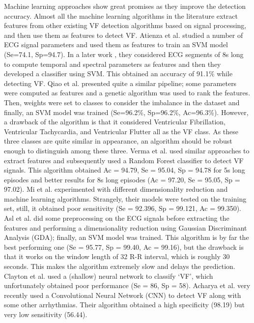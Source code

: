 \documentclass[12pt,a4paper]{article}
\begin{document}
Machine learning approaches show great promises as they improve the detection accuracy. Almost all the machine learning algorithms in the literature extract features from other existing VF detection algorithms based on signal processing, and then use them as features to detect VF. Atienza et al. \cite{alonso2012feature} studied a number of ECG signal parameters and used them as features to train an SVM model (Se=74.1, Sp=94.7). In a later work \cite{alonso2014detection}, they considered ECG segments of 8s long to compute temporal and spectral parameters as features and then they developed a classifier using SVM. This obtained an accuracy of 91.1\% while detecting VF. Qiao et al. \cite{li2014ventricular} presented quite a similar pipeline; some parameters were computed as features and a genetic algorithm was used to rank the features. Then, weights were set to classes to consider the imbalance in the dataset and finally, an SVM model was trained (Se=96.2\%, Sp=96.2\%, Ac=96.3\%). However, a drawback of the algorithm is that it considered Ventricular Fibrillation, Ventricular Tachycardia, and Ventricular Flutter all as the VF class. As these three classes are quite similar in appearance, an algorithm should be robust enough to distinguish among these three. Verma et al. \cite{verma2016detection} used similar approaches to extract features and subsequently used a Random Forest classifier to detect VF signals. This algorithm obtained Ac = 94.79, Se = 95.04, Sp = 94.78 for 5s long episodes and better results for 8s long episodes (Ac = 97.20, Se = 95.05, Sp = 97.02). Mi et al. \cite{song2005support} experimented with different dimensionality reduction and machine learning algorithms. %
 Strangely, their models were tested on the training set, still, it obtained poor sensitivity (Se = 92.396, Sp = 99.121, Ac = 99.350). Asl et al. \cite{asl2008support} did some preprocessing on the ECG signals before extracting the features and performing a dimensionality reduction using Gaussian Discriminant Analysis (GDA); finally, an SVM model was trained. This algorithm is by far the best performing one (Se = 95.77, Sp = 99.40, Ac = 99.16), but the drawback is that it works on the window length of 32 R-R interval, which is roughly 30 seconds. This makes the algorithm extremely slow and delays the prediction. Clayton et al. \cite{clayton1994recognition} used a (shallow) neural network to classify `VF', which unfortunately obtained poor performance (Se = 86, Sp = 58). Acharya et al. \cite{acharya2017automated} very recently used a Convolutional Neural Network (CNN) to detect VF along with some other arrhythmias. Their algorithm obtained a high specificity (98.19) but very low sensitivity (56.44).
\end{document}
